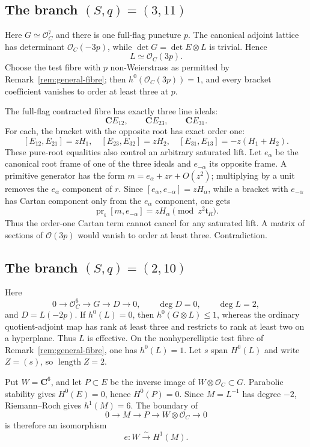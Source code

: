 \documentclass[11pt]{article}
\theoremstyle{definition}
\newcommand{\C}{\mathbf C}
\newcommand{\Ocal}{\mathcal O}
\begin{document}
\subsection{The branch \texorpdfstring{$(S,q)=(3,11)$}{(S,q)=(3,11)}}

Here $G\simeq\Ocal_C^7$ and there is one full-flag puncture $p$.
The canonical adjoint lattice has determinant $\Ocal_C(-3p)$, while
$\det G=\det E\otimes L$ is trivial.  Hence
\[
 L\simeq\Ocal_C(3p).
\]
Choose the test fibre with $p$ non-Weierstrass as permitted by
Remark~\ref{rem:general-fibre}; then
$h^0(\Ocal_C(3p))=1$, and every bracket coefficient vanishes to order at
least three at $p$.

The full-flag contracted fibre has exactly three line ideals:
\[
 \C E_{12},\qquad \C E_{23},\qquad \C E_{31}.
\]
For each, the bracket with the opposite root has exact order one:
\[
 [E_{12},E_{21}]=zH_1,
 \quad [E_{23},E_{32}]=zH_2,
 \quad [E_{31},E_{13}]=-z(H_1+H_2).
\]
These pure-root equalities also control an arbitrary saturated lift.  Let
$e_\alpha$ be the canonical root frame of one of the three ideals and
$e_{-\alpha}$ its opposite frame.  A primitive generator has the form
$m=e_\alpha+zr+O(z^2)$; multiplying by a unit removes the
$e_\alpha$ component of $r$.  Since
$[e_\alpha,e_{-\alpha}]=zH_\alpha$, while a bracket with
$e_{-\alpha}$ has Cartan component only from the $e_\alpha$ component, one
gets
\[
 \operatorname{pr}_{\mathfrak t}[m,e_{-\alpha}]
 =zH_\alpha\pmod {z^2\mathfrak t_R}.
\]
Thus the order-one Cartan term cannot cancel for any saturated lift.
A matrix of sections of $\Ocal(3p)$ would vanish to order at least three.
Contradiction.

\subsection{The branch \texorpdfstring{$(S,q)=(2,10)$}{(S,q)=(2,10)}}

Here
\[
 0\to\Ocal_C^6\to G\to D\to0,
 \qquad \deg D=0,
 \qquad \deg L=2,
\]
and $D=L(-2p)$.  If $h^0(L)=0$, then $h^0(G\otimes L)\le1$, whereas the
ordinary quotient-adjoint map has rank at least three and restricts to rank
at least two on a hyperplane.  Thus $L$ is effective.  On the
nonhyperelliptic test fibre of Remark~\ref{rem:general-fibre}, one has
$h^0(L)=1$.  Let $s$ span $H^0(L)$ and write $Z=(s)$, so
$\operatorname{length}Z=2$.

Put $W=\C^6$, and let $P\subset E$ be the inverse image of
$W\otimes\Ocal_C\subset G$.  Parabolic stability gives $H^0(E)=0$, hence
$H^0(P)=0$.  Since $M=L^{-1}$ has degree $-2$, Riemann--Roch gives
$h^1(M)=6$.  The boundary of
\[
 0\longrightarrow M\longrightarrow P
 \longrightarrow W\otimes\Ocal_C\longrightarrow0
\]
is therefore an isomorphism
\[
 e:W\xrightarrow{\sim}H^1(M).
\]
\end{document}
